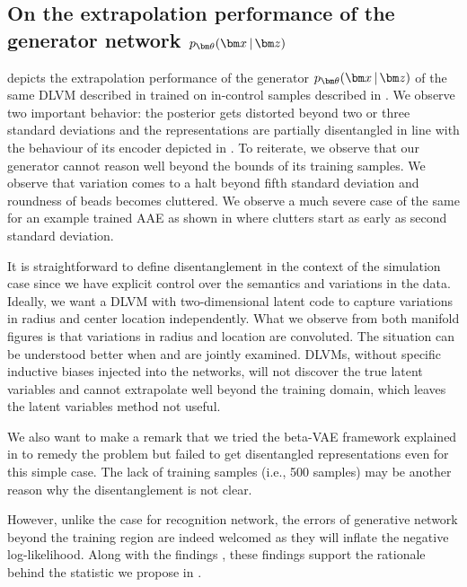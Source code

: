 \documentclass[journal, peerreview]{IEEEtran}
\begin{document}
\subsection{On the extrapolation performance of the generator network $\decoding$}
\label{sec:simstudy:generator}
 depicts the extrapolation performance of the generator $\decoding$ of the same DLVM described in  trained on in-control samples described in .
We observe two important behavior: the posterior gets distorted beyond two or three standard deviations and the representations are partially disentangled in line with the behaviour of its encoder depicted in .
To reiterate, we observe that our generator cannot reason well beyond the bounds of its training samples.
We observe that variation comes to a halt beyond fifth standard deviation and roundness of beads becomes cluttered.
We observe a much severe case of the same for an example trained AAE as shown in  where clutters start as early as second standard deviation.

It is straightforward to define disentanglement in the context of the simulation case since we have explicit control over the semantics and variations in the data.
Ideally, we want a DLVM with two-dimensional latent code to capture variations in radius and center location independently.
What we observe from both manifold figures is that variations in radius and location are convoluted.
The situation can be understood better when  and  are jointly examined.
DLVMs, without specific inductive biases injected into the networks, will not discover the true latent variables and cannot extrapolate well beyond the training domain, which leaves the latent variables method not useful. 
 
We also want to make a remark that we tried the beta-VAE framework explained in \cite{higgins2017beta} to remedy the problem but failed to get disentangled representations even for this simple case. The lack of training samples (i.e., 500 samples) may be another reason why the disentanglement is not clear.   

However, unlike the case for recognition network, the errors of generative network beyond the training region are indeed welcomed as they will inflate the negative log-likelihood.
Along with the findings , these findings support the rationale behind the statistic we propose in .
\end{document}

